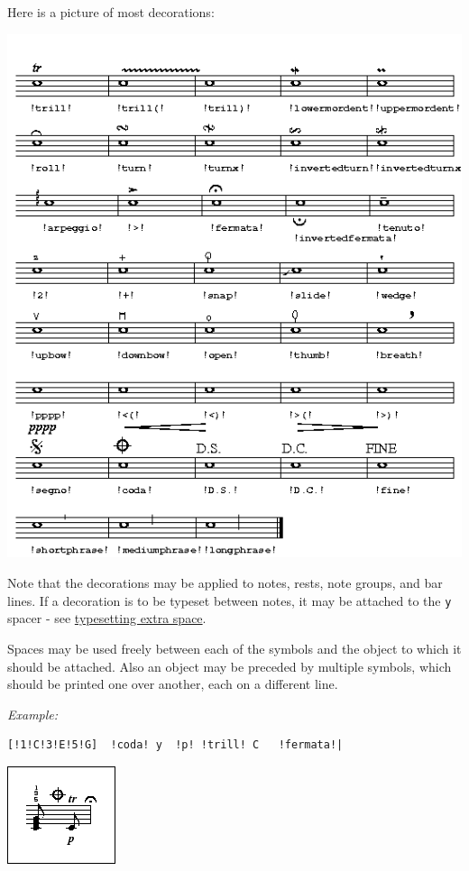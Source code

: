 \documentclass[oneside]{book}
\begin{document}
Here is a picture of most decorations:

\href{/wiki/_detail/abc:standard:decorations.0000.png?id=abc\%3Astandard\%3Av2.1}{\includegraphics{wiki/_media/abc-standard-decorations.0000.png}}

Note that the decorations may be applied to notes, rests, note groups,
and bar lines. If a decoration is to be typeset between notes, it may be
attached to the \texttt{y} spacer - see
\protect\hyperlink{typesetting_extra_space}{typesetting extra space}.

Spaces may be used freely between each of the symbols and the object to
which it should be attached. Also an object may be preceded by multiple
symbols, which should be printed one over another, each on a different
line.

\emph{Example:}

\begin{verbatim}
[!1!C!3!E!5!G]  !coda! y  !p! !trill! C   !fermata!|
\end{verbatim}

\href{/wiki/_detail/abc:standard:decorations2-80.png?id=abc\%3Astandard\%3Av2.1}{\includegraphics{wiki/_media/abc-standard-decorations2-80.png}}
\end{document}
